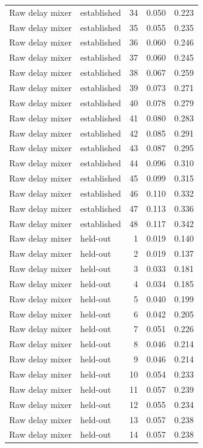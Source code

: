 \begin{tabular}{llrrr}
Raw delay mixer & established & 34 & 0.050 & 0.223 \\
Raw delay mixer & established & 35 & 0.055 & 0.235 \\
Raw delay mixer & established & 36 & 0.060 & 0.246 \\
Raw delay mixer & established & 37 & 0.060 & 0.245 \\
Raw delay mixer & established & 38 & 0.067 & 0.259 \\
Raw delay mixer & established & 39 & 0.073 & 0.271 \\
Raw delay mixer & established & 40 & 0.078 & 0.279 \\
Raw delay mixer & established & 41 & 0.080 & 0.283 \\
Raw delay mixer & established & 42 & 0.085 & 0.291 \\
Raw delay mixer & established & 43 & 0.087 & 0.295 \\
Raw delay mixer & established & 44 & 0.096 & 0.310 \\
Raw delay mixer & established & 45 & 0.099 & 0.315 \\
Raw delay mixer & established & 46 & 0.110 & 0.332 \\
Raw delay mixer & established & 47 & 0.113 & 0.336 \\
Raw delay mixer & established & 48 & 0.117 & 0.342 \\
Raw delay mixer & held-out & 1 & 0.019 & 0.140 \\
Raw delay mixer & held-out & 2 & 0.019 & 0.137 \\
Raw delay mixer & held-out & 3 & 0.033 & 0.181 \\
Raw delay mixer & held-out & 4 & 0.034 & 0.185 \\
Raw delay mixer & held-out & 5 & 0.040 & 0.199 \\
Raw delay mixer & held-out & 6 & 0.042 & 0.205 \\
Raw delay mixer & held-out & 7 & 0.051 & 0.226 \\
Raw delay mixer & held-out & 8 & 0.046 & 0.214 \\
Raw delay mixer & held-out & 9 & 0.046 & 0.214 \\
Raw delay mixer & held-out & 10 & 0.054 & 0.233 \\
Raw delay mixer & held-out & 11 & 0.057 & 0.239 \\
Raw delay mixer & held-out & 12 & 0.055 & 0.234 \\
Raw delay mixer & held-out & 13 & 0.057 & 0.238 \\
Raw delay mixer & held-out & 14 & 0.057 & 0.238 \\

\end{tabular}
